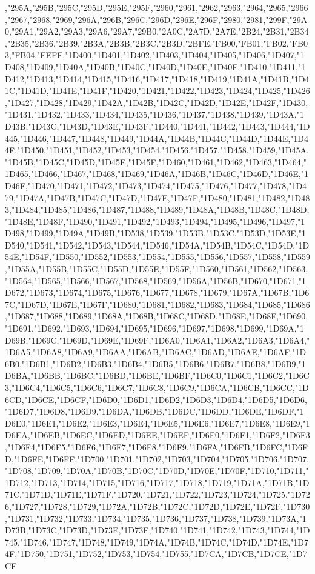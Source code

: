 ,"295A,"295B,"295C,"295D,"295E,"295F,"2960,"2961,"2962,"2963,"2964,"2965,"2966,"2967,"2968,"2969,"296A,"296B,"296C,"296D,"296E,"296F,"2980,"2981,"299F,"29A0,"29A1,"29A2,"29A3,"29A6,"29A7,"29B0,"2A0C,"2A7D,"2A7E,"2B24,"2B31,"2B34,"2B35,"2B36,"2B39,"2B3A,"2B3B,"2B3C,"2B3D,"2BFE,"FB00,"FB01,"FB02,"FB03,"FB04,"FEFF,"1D400,"1D401,"1D402,"1D403,"1D404,"1D405,"1D406,"1D407,"1D408,"1D409,"1D40A,"1D40B,"1D40C,"1D40D,"1D40E,"1D40F,"1D410,"1D411,"1D412,"1D413,"1D414,"1D415,"1D416,"1D417,"1D418,"1D419,"1D41A,"1D41B,"1D41C,"1D41D,"1D41E,"1D41F,"1D420,"1D421,"1D422,"1D423,"1D424,"1D425,"1D426,"1D427,"1D428,"1D429,"1D42A,"1D42B,"1D42C,"1D42D,"1D42E,"1D42F,"1D430,"1D431,"1D432,"1D433,"1D434,"1D435,"1D436,"1D437,"1D438,"1D439,"1D43A,"1D43B,"1D43C,"1D43D,"1D43E,"1D43F,"1D440,"1D441,"1D442,"1D443,"1D444,"1D445,"1D446,"1D447,"1D448,"1D449,"1D44A,"1D44B,"1D44C,"1D44D,"1D44E,"1D44F,"1D450,"1D451,"1D452,"1D453,"1D454,"1D456,"1D457,"1D458,"1D459,"1D45A,"1D45B,"1D45C,"1D45D,"1D45E,"1D45F,"1D460,"1D461,"1D462,"1D463,"1D464,"1D465,"1D466,"1D467,"1D468,"1D469,"1D46A,"1D46B,"1D46C,"1D46D,"1D46E,"1D46F,"1D470,"1D471,"1D472,"1D473,"1D474,"1D475,"1D476,"1D477,"1D478,"1D479,"1D47A,"1D47B,"1D47C,"1D47D,"1D47E,"1D47F,"1D480,"1D481,"1D482,"1D483,"1D484,"1D485,"1D486,"1D487,"1D488,"1D489,"1D48A,"1D48B,"1D48C,"1D48D,"1D48E,"1D48F,"1D490,"1D491,"1D492,"1D493,"1D494,"1D495,"1D496,"1D497,"1D498,"1D499,"1D49A,"1D49B,"1D538,"1D539,"1D53B,"1D53C,"1D53D,"1D53E,"1D540,"1D541,"1D542,"1D543,"1D544,"1D546,"1D54A,"1D54B,"1D54C,"1D54D,"1D54E,"1D54F,"1D550,"1D552,"1D553,"1D554,"1D555,"1D556,"1D557,"1D558,"1D559,"1D55A,"1D55B,"1D55C,"1D55D,"1D55E,"1D55F,"1D560,"1D561,"1D562,"1D563,"1D564,"1D565,"1D566,"1D567,"1D568,"1D569,"1D56A,"1D56B,"1D670,"1D671,"1D672,"1D673,"1D674,"1D675,"1D676,"1D677,"1D678,"1D679,"1D67A,"1D67B,"1D67C,"1D67D,"1D67E,"1D67F,"1D680,"1D681,"1D682,"1D683,"1D684,"1D685,"1D686,"1D687,"1D688,"1D689,"1D68A,"1D68B,"1D68C,"1D68D,"1D68E,"1D68F,"1D690,"1D691,"1D692,"1D693,"1D694,"1D695,"1D696,"1D697,"1D698,"1D699,"1D69A,"1D69B,"1D69C,"1D69D,"1D69E,"1D69F,"1D6A0,"1D6A1,"1D6A2,"1D6A3,"1D6A4,"1D6A5,"1D6A8,"1D6A9,"1D6AA,"1D6AB,"1D6AC,"1D6AD,"1D6AE,"1D6AF,"1D6B0,"1D6B1,"1D6B2,"1D6B3,"1D6B4,"1D6B5,"1D6B6,"1D6B7,"1D6B8,"1D6B9,"1D6BA,"1D6BB,"1D6BC,"1D6BD,"1D6BE,"1D6BF,"1D6C0,"1D6C1,"1D6C2,"1D6C3,"1D6C4,"1D6C5,"1D6C6,"1D6C7,"1D6C8,"1D6C9,"1D6CA,"1D6CB,"1D6CC,"1D6CD,"1D6CE,"1D6CF,"1D6D0,"1D6D1,"1D6D2,"1D6D3,"1D6D4,"1D6D5,"1D6D6,"1D6D7,"1D6D8,"1D6D9,"1D6DA,"1D6DB,"1D6DC,"1D6DD,"1D6DE,"1D6DF,"1D6E0,"1D6E1,"1D6E2,"1D6E3,"1D6E4,"1D6E5,"1D6E6,"1D6E7,"1D6E8,"1D6E9,"1D6EA,"1D6EB,"1D6EC,"1D6ED,"1D6EE,"1D6EF,"1D6F0,"1D6F1,"1D6F2,"1D6F3,"1D6F4,"1D6F5,"1D6F6,"1D6F7,"1D6F8,"1D6F9,"1D6FA,"1D6FB,"1D6FC,"1D6FD,"1D6FE,"1D6FF,"1D700,"1D701,"1D702,"1D703,"1D704,"1D705,"1D706,"1D707,"1D708,"1D709,"1D70A,"1D70B,"1D70C,"1D70D,"1D70E,"1D70F,"1D710,"1D711,"1D712,"1D713,"1D714,"1D715,"1D716,"1D717,"1D718,"1D719,"1D71A,"1D71B,"1D71C,"1D71D,"1D71E,"1D71F,"1D720,"1D721,"1D722,"1D723,"1D724,"1D725,"1D726,"1D727,"1D728,"1D729,"1D72A,"1D72B,"1D72C,"1D72D,"1D72E,"1D72F,"1D730,"1D731,"1D732,"1D733,"1D734,"1D735,"1D736,"1D737,"1D738,"1D739,"1D73A,"1D73B,"1D73C,"1D73D,"1D73E,"1D73F,"1D740,"1D741,"1D742,"1D743,"1D744,"1D745,"1D746,"1D747,"1D748,"1D749,"1D74A,"1D74B,"1D74C,"1D74D,"1D74E,"1D74F,"1D750,"1D751,"1D752,"1D753,"1D754,"1D755,"1D7CA,"1D7CB,"1D7CE,"1D7CF